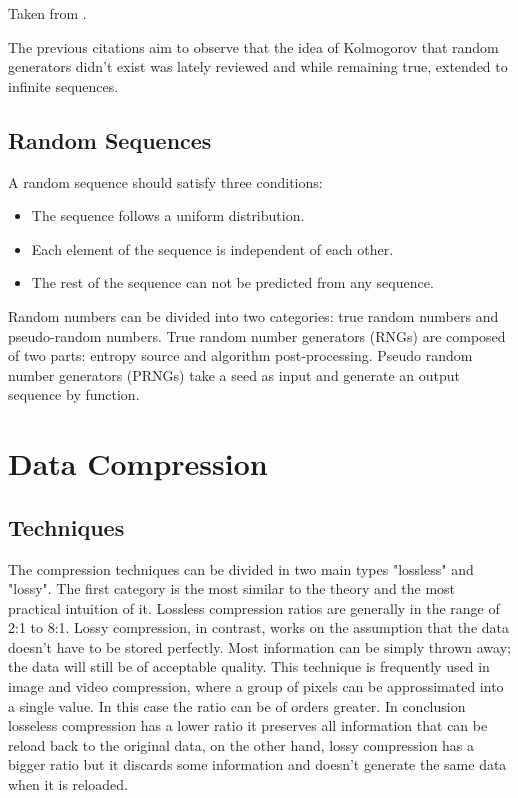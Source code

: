 \documentclass[12pt, a4paper]{report}
\begin{document}
Taken from \cite{AlgorithmicRandomnessAndComplexity}.

The previous citations aim to observe that the idea of Kolmogorov that random generators didn't exist was lately reviewed and
while remaining true, extended to infinite sequences.

\section{Random Sequences}

A random sequence should satisfy three conditions:

\begin{itemize}
  \item The sequence follows a uniform distribution.
  \item Each element of the sequence is independent of each other.
  \item The rest of the sequence can not be predicted from any sequence.
\end{itemize}

Random numbers can be divided into two categories: true random numbers and pseudo-random numbers.
True random number generators (RNGs) are composed of two parts: entropy source and algorithm post-processing.
Pseudo random number generators (PRNGs) take a seed as input and generate an output sequence by function.

\chapter{Data Compression}

\section{Techniques}

The compression techniques can be divided in two main types "lossless" and "lossy".
The first category is the most similar to the theory and the most practical intuition of it.
Lossless compression ratios are generally in the range of 2:1 to 8:1. Lossy compression, in contrast, works on the assumption that
the data doesn't have to be stored perfectly. Most information can be simply thrown away; the data will still be of acceptable
quality. This technique is frequently used in image and video compression, where a group of pixels can be approssimated into a
single value. In this case the ratio can be of orders greater. In conclusion losseless compression has a lower ratio it preserves
all information that can be reload back to the original data, on the other hand, lossy compression has a bigger ratio but it
discards some information and doesn't generate the same data when it is reloaded.
\end{document}
